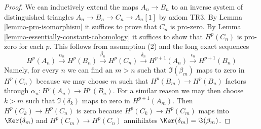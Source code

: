 \begin{proof}
We can inductively extend the maps $A_n \to B_n$ to an inverse system of
distinguished triangles $A_n \to B_n \to C_n \to A_n[1]$ by
axiom TR3. By Lemma \ref{lemma-pro-isomorphism} it suffices to prove
that $C_n$ is pro-zero. By Lemma \ref{lemma-essentially-constant-cohomology}
it suffices to show that $H^p(C_n)$ is pro-zero for each $p$.
This follows from assumption (2) and the long exact sequences
$$
H^p(A_n) \xrightarrow{\alpha_n} H^p(B_n)
\xrightarrow{\beta_n}
H^p(C_n) \xrightarrow{\delta_n} H^{p + 1}(A_n)
\xrightarrow{\epsilon_n}
H^{p + 1}(B_n)
$$
Namely, for every $n$ we can find an $m > n$ such that
$\Im(\beta_m)$ maps to zero in $H^p(C_n)$ because we may choose
$m$ such that $H^p(B_m) \to H^p(B_n)$ factors through
$\alpha_n : H^p(A_n) \to H^p(B_n)$. For a similar reason we may
then choose $k > m$ such that $\Im(\delta_k)$ maps to zero
in $H^{p + 1}(A_m)$. Then $H^p(C_k) \to H^p(C_n)$ is zero because
$H^p(C_k) \to H^p(C_m)$ maps into $\Ker(\delta_m)$ and $H^p(C_m) \to H^p(C_n)$
annihilates $\Ker(\delta_m) = \Im(\beta_m)$.
\end{proof}














